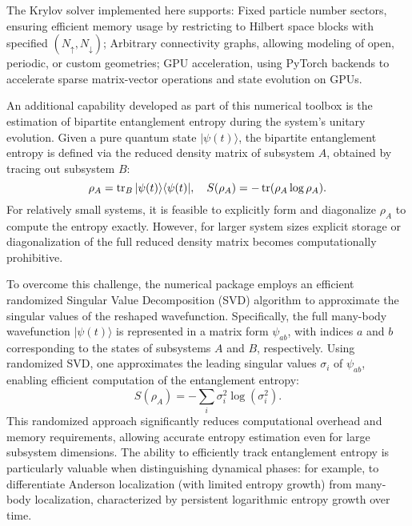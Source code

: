 The Krylov solver implemented here supports: {Fixed particle number sectors}, ensuring efficient memory usage by restricting to Hilbert space blocks with specified $(N_\uparrow, N_\downarrow)$; {Arbitrary connectivity graphs}, allowing modeling of open, periodic, or custom geometries; {GPU acceleration}, using PyTorch backends to accelerate sparse matrix-vector operations and state evolution on GPUs.



An additional capability developed as part of this numerical toolbox is the estimation of bipartite entanglement entropy during the system's unitary evolution. Given a pure quantum state $|\psi(t)\rangle$, the bipartite entanglement entropy is defined via the reduced density matrix of subsystem $A$, obtained by tracing out subsystem $B$:
\begin{equation}
\rho_A = \mathop{\mathrm{tr}}\nolimits_B |\psi(t)\rangle \langle \psi(t)|,\quad
S(\rho_A) = -\mathop{\mathrm{tr}}\nolimits(\rho_A \log \rho_A).
\end{equation}
For relatively small systems, it is feasible to explicitly form and diagonalize $\rho_A$ to compute the entropy exactly. However, for larger system sizes explicit storage or diagonalization of the full reduced density matrix becomes computationally prohibitive.

To overcome this challenge, the numerical package employs an efficient randomized Singular Value Decomposition (SVD) algorithm \cite{halko_finding_2011} to approximate the singular values of the reshaped wavefunction. Specifically, the full many-body wavefunction $|\psi(t)\rangle$ is represented in a matrix form $\psi_{ab}$, with indices $a$ and $b$ corresponding to the states of subsystems $A$ and $B$, respectively. Using randomized SVD, one approximates the leading singular values ${\sigma_i}$ of $\psi_{ab}$, enabling efficient computation of the entanglement entropy:
\begin{equation}
S(\rho_A) = -\sum_i \sigma_i^2 \log(\sigma_i^2).
\end{equation}
This randomized approach significantly reduces computational overhead and memory requirements, allowing accurate entropy estimation even for large subsystem dimensions. The ability to efficiently track entanglement entropy is particularly valuable when distinguishing dynamical phases: for example, to differentiate Anderson localization (with limited entropy growth) from many-body localization, characterized by persistent logarithmic entropy growth over time.


